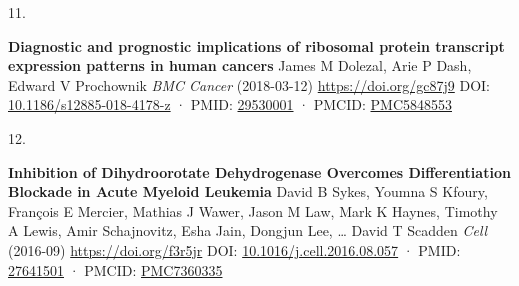 \documentclass[
]{article}
\newlength{\cslhangindent}
\newlength{\csllabelwidth}
\newlength{\cslentryspacingunit} %
\newenvironment{CSLReferences}[2] %
 {%
  \setlength{\parindent}{0pt}
  \ifodd #1
  \let\oldpar\par
  \def\par{\hangindent=\cslhangindent\oldpar}
  \fi
  \setlength{\parskip}{#2\cslentryspacingunit}
 }%
 {}
\newcommand{\CSLBlock}[1]{#1\hfill\break}
\newcommand{\CSLLeftMargin}[1]{\parbox[t]{\csllabelwidth}{#1}}
\newcommand{\CSLRightInline}[1]{\parbox[t]{\linewidth - \csllabelwidth}{#1}\break}
\begin{document}
\begin{CSLReferences}{0}{0}
\leavevmode{}%
\CSLLeftMargin{11. }%
\CSLRightInline{\textbf{Diagnostic and prognostic implications of ribosomal protein transcript expression patterns in human cancers}
\CSLBlock{James M Dolezal, Arie P Dash, Edward V Prochownik} \emph{BMC Cancer} (2018-03-12) \url{https://doi.org/gc87j9}
\CSLBlock{DOI: \href{https://doi.org/10.1186/s12885-018-4178-z}{10.1186/s12885-018-4178-z} · PMID: \href{https://www.ncbi.nlm.nih.gov/pubmed/29530001}{29530001} · PMCID: \href{https://www.ncbi.nlm.nih.gov/pmc/articles/PMC5848553}{PMC5848553}}}

\leavevmode{}%
\CSLLeftMargin{12. }%
\CSLRightInline{\textbf{Inhibition of Dihydroorotate Dehydrogenase Overcomes Differentiation Blockade in Acute Myeloid Leukemia}
\CSLBlock{David B Sykes, Youmna S Kfoury, François E Mercier, Mathias J Wawer, Jason M Law, Mark K Haynes, Timothy A Lewis, Amir Schajnovitz, Esha Jain, Dongjun Lee, \ldots{} David T Scadden} \emph{Cell} (2016-09) \url{https://doi.org/f3r5jr}
\CSLBlock{DOI: \href{https://doi.org/10.1016/j.cell.2016.08.057}{10.1016/j.cell.2016.08.057} · PMID: \href{https://www.ncbi.nlm.nih.gov/pubmed/27641501}{27641501} · PMCID: \href{https://www.ncbi.nlm.nih.gov/pmc/articles/PMC7360335}{PMC7360335}}}

\end{CSLReferences}
\end{document}

